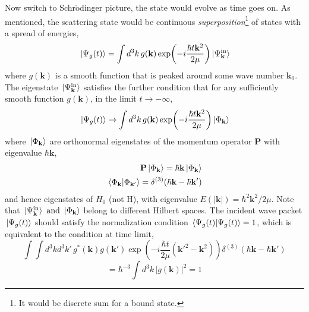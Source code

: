 \documentclass[12pt]{article}
\numberwithin{equation}{section}
\begin{document}
Now switch to Schr$\ddot{\text{o}}$dinger picture, the state would evolve as time goes on.
As mentioned, the scattering state would be continuous \textit{superposition}\footnote{It would be discrete sum for a bound state.} of states with a spread of energies,
\begin{equation}
    \ket*{\Psi_{g}(t)} = \int{d^{3}k\,g(\mathbf{k})\exp(-i\frac{\hbar t\mathbf{k}^2}{2\mu})\ket*{\Psi_{\mathbf{k}}^{\text{in}}}}
\end{equation}
where $g(\mathbf{k})$ is a smooth function that is peaked around some wave number $\mathbf{k}_0$.
The eigenstate $\ket*{\Psi_{\mathbf{k}}^{\text{in}}}$ satisfies the further condition that for any sufficiently smooth  function $g(\mathbf{k})$, in the limit $t\rightarrow-\infty$,
\begin{equation}
    \ket*{\Psi_{g}(t)}\rightarrow\int{d^3k\,g(\mathbf{k})\exp(-i\frac{\hbar t\mathbf{k}^2}{2\mu})\ket*{\Phi_{\mathbf{k}}}}
\end{equation}
where $\ket*{\Phi_{\mathbf{k}}}$ are orthonormal eigenstates of the momentum operator $\mathbf{P}$ with eigenvalue $\hbar\mathbf{k}$,
\begin{equation}
    \begin{split}
        \mathbf{P}\ket*{\Phi_{\mathbf{k}}} = \hbar\mathbf{k}\ket*{\Phi_{\mathbf{k}}}\\
        \braket*{\Phi_{\mathbf{k}}}{\Phi_{\mathbf{k}'}} = \delta^{(3)}(\hbar\mathbf{k} - \hbar\mathbf{k}')
    \end{split}
\end{equation}
and hence eigenstates of $H_0$ (not H), with eigenvalue $E(|\mathbf{k}|) = \hbar^2\mathbf{k}^2/2\mu$. 
Note that $\ket*{\Psi_{\mathbf{k}}^{\text{in}}}\text{ and } \ket*{\Phi_{\mathbf{k}}}$ belong to different Hilbert spaces.
The incident wave packet $\ket*{\Psi_{g}(t)}$ should satisfy the normalization condition $\braket*{\Psi_{g}(t)}{\Psi_{g}(t)} = 1$, which is equivalent to the condition at time limit,
\[\int\int{d^3kd^{3}k'\,g^{*}(\mathbf{k})g(\mathbf{k}')\exp(-i\frac{\hbar t}{2\mu}(\mathbf{k}'^2-\mathbf{k}^2))\delta^{(3)}(\hbar\mathbf{k} - \hbar\mathbf{k}')}\]
\begin{equation}
    = \hbar^{-3}\int{d^3k\,|g(\mathbf{k})|^2} = 1
\end{equation}
\end{document}
